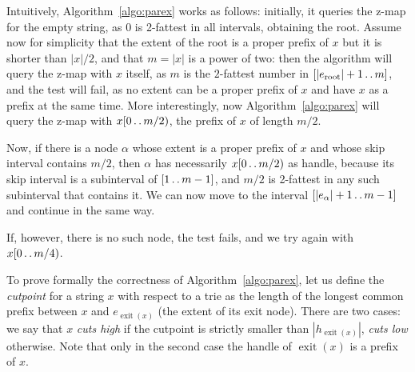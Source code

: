 \documentclass[a4paper]{article}
\newcommand{\exit}[1]{\operatorname{exit}(#1)}
\newcommand{\?}{\mskip1.5mu}
\def\..{\,\mathpunct{\ldotp\ldotp}} %
\begin{document}
Intuitively, Algorithm~\ref{algo:parex} works as follows: initially, it queries the z-map
for the empty string, as $0$ is 2-fattest in all intervals, obtaining the root. Assume now for simplicity
that the extent of the root is a proper prefix of $x$ but it is shorter than $|x|/2$, and that $m=|x|$ is a power of two: then 
the algorithm will query the z-map with $x$ itself, as $m$ is the $2$-fattest number in $[|e_{\mathrm{root}}|+1\..m]$, and the test will fail,
as no extent can be a proper prefix of $x$ and have $x$ as a prefix at the same time.
More interestingly, now Algorithm~\ref{algo:parex}  
 will query the z-map with $x[0\.. m/2)$, the prefix of $x$ of length $m/2$.
 
Now, if there is a node $\alpha$ whose extent is a proper prefix of $x$ and whose skip interval contains $m/2$,
then $\alpha$ has necessarily $x[0\.. m/2)$ as handle,
because its skip interval is a subinterval of $[1\..m-1]$, and $m/2$ is 2-fattest in any such subinterval that contains it.
We can now move to the interval $[|e_\alpha|+1\..m-1]$ and continue in the
same way.

If, however, there is no such node, the test fails, and we try again with
$x[0\.. m/4)$.

To prove formally the correctness of Algorithm~\ref{algo:parex}, let us define the
\emph{cutpoint} for a string $x$ with respect to a trie as the length of the
longest common prefix between $x$ and $e_{\exit x}$ (the extent of its exit node). There are two cases: 
we say that $x$ \emph{cuts high}
if the cutpoint is strictly smaller than $|h_{\exit x}|$, \emph{cuts low}
otherwise. Note that only in the second case the handle of $\exit x$ is a prefix
of $x$. 
\end{document}
